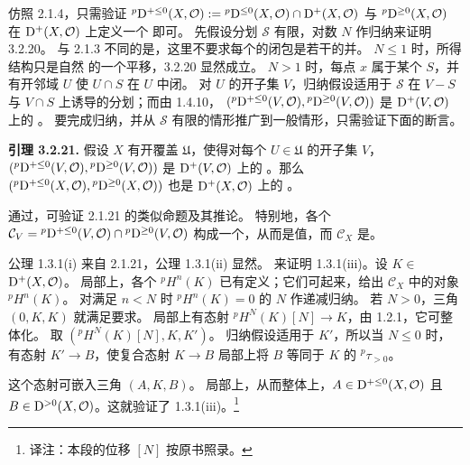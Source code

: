 仿照 2.1.4，只需验证
${}^p\mathrm{D}^{+\leq0}(X,\mathcal O):={}^{p}\mathrm{D}^{\leq0}(X,\mathcal O)\cap\mathrm{D}^+(X,\mathcal O)$
与 ${}^p\mathrm{D}^{\geq0}(X,\mathcal O)$ 在 $\mathrm{D}^+(X,\mathcal O)$ 上定义一个
即可。
先假设分划 $\mathscr S$ 有限，对数 $N$ 作归纳来证明 3.2.20。
与 2.1.3 不同的是，这里不要求每个的闭包是若干的并。
$N\leq1$ 时，所得结构只是自然 的一个平移，3.2.20 显然成立。
$N>1$ 时，每点 $x$ 属于某个 $S$，并有开邻域 $U$ 使
$U\cap S$ 在 $U$ 中闭。
对 $U$ 的开子集 $V$，归纳假设适用于 $\mathscr S$ 在 $V-S$ 与
$V\cap S$ 上诱导的分划；而由 1.4.10，
$({}^p\mathrm{D}^{+\leq0}(V,\mathcal O),\allowbreak{}^p\mathrm{D}^{\geq0}(V,\mathcal O))$
是 $\mathrm{D}^+(V,\mathcal O)$ 上的 。
要完成归纳，并从 $\mathscr S$ 有限的情形推广到一般情形，只需验证下面的断言。

\par\medskip\noindent\textbf{引理 3.2.21.}
假设 $X$ 有开覆盖 $\mathfrak U$，使得对每个 $U\in\mathfrak U$ 的开子集
$V$，$({}^p\mathrm{D}^{+\leq0}(V,\mathcal O),\allowbreak{}^p\mathrm{D}^{\geq0}(V,\mathcal O))$
是 $\mathrm{D}^+(V,\mathcal O)$ 上的 。那么
$({}^p\mathrm{D}^{+\leq0}(X,\mathcal O),\allowbreak{}^p\mathrm{D}^{\geq0}(X,\mathcal O))$
也是 $\mathrm{D}^+(X,\mathcal O)$ 上的 。

通过，可验证 2.1.21 的类似命题及其推论。
特别地，各个
$\mathcal C_V={}^p\mathrm{D}^{+\leq0}(V,\mathcal O)\cap{}^p\mathrm{D}^{\geq0}(V,\mathcal O)$
构成一个，从而是值，而 $\mathcal C_X$ 是。

公理 1.3.1(i) 来自 2.1.21，公理 1.3.1(ii) 显然。
来证明 1.3.1(iii)。设 $K\in$
$\mathrm{D}^+(X,\mathcal O)$。
局部上，各个 ${}^pH^n(K)$ 已有定义；它们可起来，给出
$\mathcal C_X$ 中的对象 ${}^pH^n(K)$。
对满足 $n<N$ 时 ${}^pH^n(K)=0$ 的 $N$ 作递减归纳。
若 $N>0$，三角 $(0,K,K)$ 就满足要求。
局部上有态射 ${}^pH^N(K)[N]\longrightarrow K$，由 1.2.1，它可整体化。
取 $({}^pH^N(K)[N],K,K')$。
归纳假设适用于 $K'$，所以当 $N\leq0$ 时，有态射
$K'\longrightarrow B$，使复合态射 $K\longrightarrow B$ 局部上将
$B$ 等同于 $K$ 的 ${}^p\tau_{>0}$。

这个态射可嵌入三角 $(A,K,B)$。
局部上，从而整体上，$A\in\mathrm{D}^{+\leq0}(X,\mathcal O)$ 且
$B\in\mathrm{D}^{>0}(X,\mathcal O)$。这就验证了 1.3.1(iii)。\footnote{译注：本段的位移 $[N]$ 按原书照录。}


